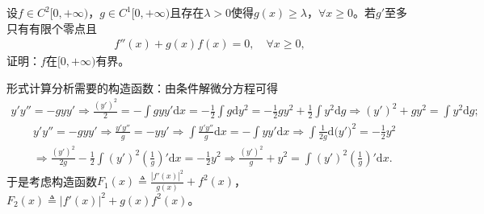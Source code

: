 \documentclass[../../main.tex]{subfiles}
\begin{document}
\begin{example}
设\(f \in C^{2}[0, +\infty)\)，\(g \in C^{1}[0, +\infty)\)且存在\(\lambda > 0\)使得\(g(x) \geqslant \lambda\)，\(\forall x \geqslant 0\)。若\(g'\)至多只有有限个零点且
\begin{align*}
f''(x)+g(x)f(x) = 0,\quad\forall x \geqslant 0,
\end{align*}
证明：\(f\)在\([0, +\infty)\)有界。
\end{example}
\begin{note}
形式计算分析需要的构造函数：由条件解微分方程可得
\begin{align*}
y' y'' =-gyy' \Longrightarrow \frac{(y' )^2}{2}=-\int{gyy' \mathrm{d}x}=-\frac{1}{2}\int{g\mathrm{d}y^2}=-\frac{1}{2}gy^2+\frac{1}{2}\int{y^2\mathrm{d}g}\Longrightarrow (y' )^2+gy^2=\int{y^2\mathrm{d}g};
\end{align*}
\begin{align*}
&y' y'' =-gyy' \Longrightarrow \frac{y' y''}{g}=-yy' \Longrightarrow \int{\frac{y' y''}{g}\mathrm{d}x}=-\int{yy' \mathrm{d}x}\Longrightarrow \int{\frac{1}{2g}\mathrm{d(}y' )^2}=-\frac{1}{2}y^2
\\
&\Longrightarrow \frac{(y' )^2}{2g}-\frac{1}{2}\int{(y' )^2\left( \frac{1}{g} \right) ' \mathrm{d}x}=-\frac{1}{2}y^2\Longrightarrow \frac{(y' )^2}{g}+y^2=\int{(y' )^2\left( \frac{1}{g} \right) ' \mathrm{d}x}.
\end{align*}
于是考虑构造函数\(F_1( x ) \triangleq \frac{| f'( x ) |^2}{g( x )}+f^2( x )\)，\(F_2( x ) \triangleq | f'( x ) |^2+g( x ) f^2( x )\)。
\end{note}
\end{document}
